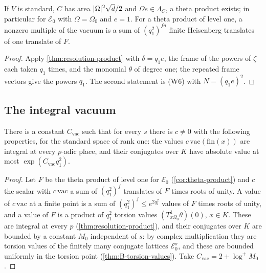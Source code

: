 \begin{corollary}\label{cor:theta-product}
If $V$ is standard, $C$ has area $\lvert \Omega\rvert^2\sqrt d/2$ and $\Omega e\in\Lambda_C$, a theta product
exists; in particular for $\mathcal E_0$ with $\Omega=\Omega_0$ and $e=1$. For a theta product of level
one, a nonzero multiple of the vacuum is a sum of $(q_1^2)^{fn}$ finite Heisenberg translates of one
translate of $F$.
\end{corollary}

\begin{proof}
Apply \cref{thm:resolution-product} with $\delta=q_1e$, the frame of the powers of $\zeta$ each taken
$q_1$ times, and the monomial $\theta$ of degree one; the repeated frame vectors give the powers $q_1$.
The second statement is (W6) with $N=(q_1e)^2$.
\end{proof}

\subsection{The integral vacuum}\label{ss:integral-vacuum}

\begin{proposition}\label{prop:vacuum-scale}
There is a constant $C_{\mathrm{vac}}$ such that for every $s$ there is $c\ne0$ with the following
properties, for the standard space of rank one: the values $c\,\mathrm{vac}(\mathrm{fin}(x))$ are
integral at every $p$-adic place, and their conjugates over $K$ have absolute value at most
$\exp(C_{\mathrm{vac}}q_1^2)$.
\end{proposition}

\begin{proof}
Let $F$ be the theta product of level one for $\mathcal E_0$ (\cref{cor:theta-product}) and $c$ the
scalar with $c\,\mathrm{vac}$ a sum of $(q_1^2)^f$ translates of $F$ times roots of unity. A value of
$c\,\mathrm{vac}$ at a finite point is a sum of $(q_1^2)^f\le e^{2q_1^2}$ values of $F$ times roots of
unity, and a value of $F$ is a product of $q_1^2$ torsion values $(T^1_{x\Omega_0}\theta)(0)$, $x\in K$.
These are integral at every $p$ (\cref{thm:resolution-product}), and their conjugates over $K$ are
bounded by a constant $M_0$ independent of $s$: by complex multiplication they are torsion values of
the finitely many conjugate lattices $\mathcal E_0^\sigma$, and these are bounded uniformly in the torsion
point (\cref{thm:B-torsion-values}). Take $C_{\mathrm{vac}}=2+\log^+M_0$.
\end{proof}

